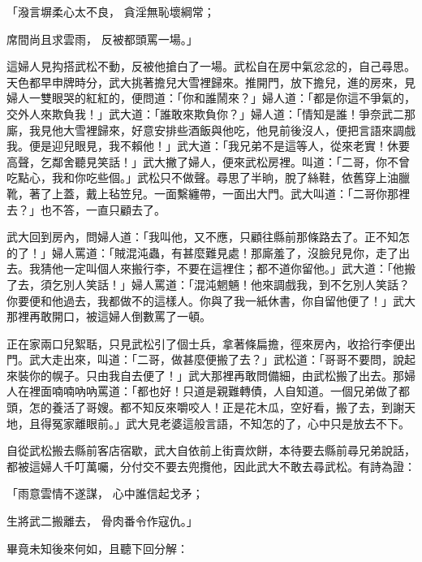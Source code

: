 「潑言塀柔心太不良，  貪淫無恥壞綱常；

席間尚且求雲雨，  反被都頭罵一場。」

這婦人見抅搭武松不動，反被他搶白了一場。武松自在房中氣忿忿的，自己尋思。天色都早申牌時分，武大挑著擔兒大雪裡歸來。推開門，放下擔兒，進的房來，見婦人一雙眼哭的紅紅的，便問道：「你和誰鬧來？」婦人道：「都是你這不爭氣的，交外人來欺負我！」武大道：「誰敢來欺負你？」婦人道：「情知是誰！爭奈武二那廝，我見他大雪裡歸來，好意安排些酒飯與他吃，他見前後沒人，便把言語來調戲我。便是迎兒眼見，我不賴他！」武大道：「我兄弟不是這等人，從來老實！休要高聲，乞鄰舍聽見笑話！」武大撇了婦人，便來武松房裡。叫道：「二哥，你不曾吃點心，我和你吃些個。」武松只不做聲。尋思了半晌，脫了絲鞋，依舊穿上油臘靴，著了上蓋，戴上毡笠兒。一面繫纏帶，一面出大門。武大叫道：「二哥你那裡去？」也不答，一直只顧去了。

武大回到房內，問婦人道：「我叫他，又不應，只顧往縣前那條路去了。正不知怎的了！」婦人罵道：「賊混沌蟲，有甚麼難見處！那廝羞了，沒臉兒見你，走了出去。我猜他一定叫個人來搬行李，不要在這裡住；都不道你留他。」武大道：「他搬了去，須乞別人笑話！」婦人罵道：「混沌魍魎！他來調戲我，到不乞別人笑話？你要便和他過去，我都做不的這樣人。你與了我一紙休書，你自留他便了！」武大那裡再敢開口，被這婦人倒數罵了一頓。

正在家兩口兒絮聒，只見武松引了個士兵，拿著條扁擔，徑來房內，收拾行李便出門。武大走出來，叫道：「二哥，做甚麼便搬了去？」武松道：「哥哥不要問，說起來裝你的幌子。只由我自去便了！」武大那裡再敢問備細，由武松搬了出去。那婦人在裡面喃喃吶吶罵道：「都也好！只道是親難轉債，人自知道。一個兄弟做了都頭，怎的養活了哥嫂。都不知反來嚼咬人！正是花木瓜，空好看，搬了去，到謝天地，且得冤家離眼前。」武大見老婆這般言語，不知怎的了，心中只是放去不下。

自從武松搬去縣前客店宿歇，武大自依前上街賣炊餅，本待要去縣前尋兄弟說話，都被這婦人千叮萬囑，分付交不要去兜攬他，因此武大不敢去尋武松。有詩為證：

「雨意雲情不遂謀，  心中誰信起戈矛；

生將武二搬離去，  骨肉番令作寇仇。」

畢竟未知後來何如，且聽下回分解：
